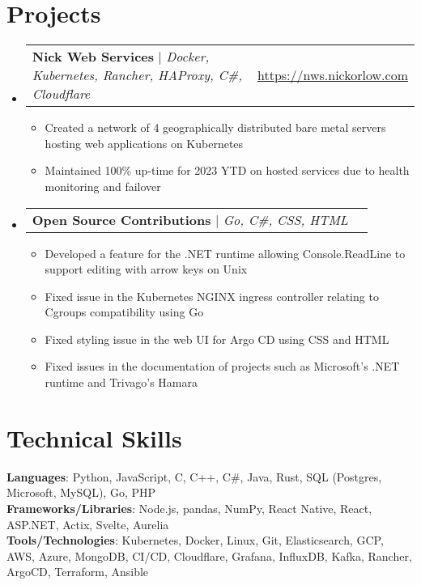 \documentclass[letterpaper,11pt]{article}
\makeatletter
\newcommand{\resumeItem}[1]{
  \item\small{
    {#1 \vspace{-2pt}}
  }
}
\newcommand{\resumeProjectHeading}[2]{
    \item
    \begin{tabular*}{0.97\textwidth}{l@{\extracolsep{\fill}}r}
      \small#1 & \underline{\href{#2}{#2}} \\
    \end{tabular*}\vspace{-7pt}
}
\newcommand{\resumeSubHeadingListStart}{\begin{itemize}[leftmargin=0.15in, label={}]}
\newcommand{\resumeSubHeadingListEnd}{\end{itemize}}
\newcommand{\resumeItemListStart}{\begin{itemize}}
\newcommand{\resumeItemListEnd}{\end{itemize}\vspace{-3pt}}
\makeatother
\begin{document}
\section{Projects}
    \resumeSubHeadingListStart
      \resumeProjectHeading
          {\textbf{Nick Web Services} $|$ \emph{Docker, Kubernetes, Rancher, HAProxy, C\#, Cloudflare}}{https://nws.nickorlow.com}
          \resumeItemListStart
            \resumeItem{Created a network of 4 geographically distributed bare metal servers hosting web applications on Kubernetes}
            \resumeItem{Maintained 100\% up-time for 2023 YTD on hosted services due to health monitoring and failover}
          \resumeItemListEnd
          \resumeProjectHeading
          {\textbf{Open Source Contributions} $|$ \emph{Go, C\#, CSS, HTML}}{}
          \resumeItemListStart
            \resumeItem{Developed a feature for the .NET runtime allowing Console.ReadLine to support editing with arrow keys on Unix}
            \resumeItem{Fixed issue in the Kubernetes NGINX ingress controller relating to Cgroups compatibility using Go}
            \resumeItem{Fixed styling issue in the web UI for Argo CD using CSS and HTML}
            \resumeItem{Fixed issues in the documentation of projects such as Microsoft's .NET runtime and Trivago's Hamara}
          \resumeItemListEnd
    \resumeSubHeadingListEnd

\section{Technical Skills}
 \begin{itemize}[leftmargin=0.15in, label={}]
    \small{\item{
     \textbf{Languages}{:  Python, JavaScript, C, C++, C\#, Java, Rust, SQL (Postgres, Microsoft, MySQL), Go, PHP} \\
     \textbf{Frameworks/Libraries}{: Node.js, pandas, NumPy, React Native, React, ASP.NET, Actix, Svelte, Aurelia} \\
     \textbf{Tools/Technologies}{: Kubernetes, Docker, Linux, Git, Elasticsearch, GCP, AWS, Azure, MongoDB, CI/CD, Cloudflare, Grafana, InfluxDB, Kafka, Rancher, ArgoCD, Terraform, Ansible} \\
    }}
 \end{itemize}


\end{document}
